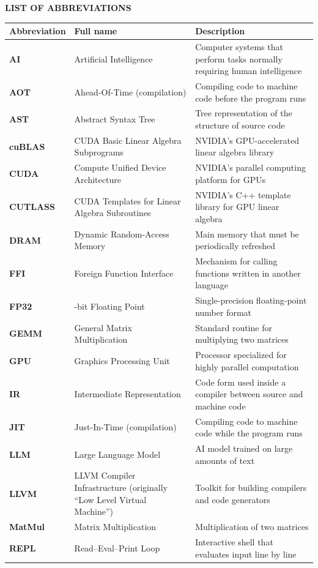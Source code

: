 \documentclass[a4paper]{article}
\begin{document}
    \vspace{10cm}
	\vspace{18pt}
	\begin{center}
		\textbf{LIST OF ABBREVIATIONS}
	\end{center}
	\vspace{-6pt}
	\begin{center}
		\renewcommand{\arraystretch}{1.15}
		\begin{tabular}{>{\bfseries}l >{\raggedright\arraybackslash}p{5.8cm} >{\raggedright\arraybackslash}p{5.8cm}}
			\toprule
			\textbf{Abbreviation} & \textbf{Full name} & \textbf{Description} \\
			\midrule
			AI      & Artificial Intelligence & Computer systems that perform tasks normally requiring human intelligence \\
			AOT     & Ahead-Of-Time (compilation) & Compiling code to machine code before the program runs \\
			AST     & Abstract Syntax Tree & Tree representation of the structure of source code \\
			cuBLAS  & CUDA Basic Linear Algebra Subprograms & NVIDIA's GPU-accelerated linear algebra library \\
			CUDA    & Compute Unified Device Architecture & NVIDIA's parallel computing platform for GPUs \\
			CUTLASS & CUDA Templates for Linear Algebra Subroutines & NVIDIA's C++ template library for GPU linear algebra \\
			DRAM    & Dynamic Random-Access Memory & Main memory that must be periodically refreshed \\
			FFI     & Foreign Function Interface & Mechanism for calling functions written in another language \\
			FP32    & 32-bit Floating Point & Single-precision floating-point number format \\
			GEMM    & General Matrix Multiplication & Standard routine for multiplying two matrices \\
			GPU     & Graphics Processing Unit & Processor specialized for highly parallel computation \\
			IR      & Intermediate Representation & Code form used inside a compiler between source and machine code \\
			JIT     & Just-In-Time (compilation) & Compiling code to machine code while the program runs \\
			LLM     & Large Language Model & AI model trained on large amounts of text \\
			LLVM    & LLVM Compiler Infrastructure (originally ``Low Level Virtual Machine'') & Toolkit for building compilers and code generators \\
			MatMul  & Matrix Multiplication & Multiplication of two matrices \\
			REPL    & Read--Eval--Print Loop & Interactive shell that evaluates input line by line \\
			\bottomrule
		\end{tabular}
	\end{center}
	
\end{document}
